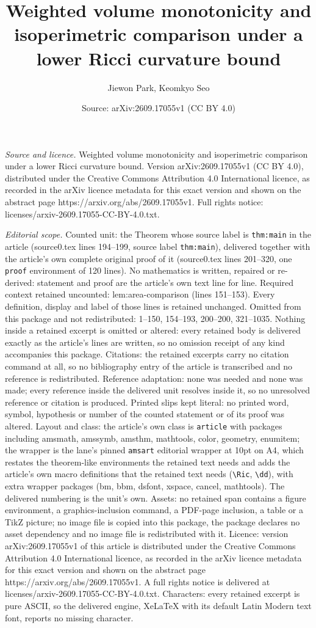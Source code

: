 \documentclass[10pt,a4paper]{amsart}
\title[Weighted volume monotonicity and isoperimetric comparison un]{Weighted volume monotonicity and isoperimetric comparison under a lower Ricci curvature bound}
\author{Jiewon Park, Keomkyo Seo}
\date{Source: arXiv:2609.17055v1 (CC BY 4.0)}
\begin{document}
\maketitle

\noindent\emph{Source and licence.} Weighted volume monotonicity and isoperimetric comparison under a lower Ricci curvature bound. Version arXiv:2609.17055v1 (CC BY 4.0), distributed under the Creative Commons Attribution 4.0 International licence, as recorded in the arXiv licence metadata for this exact version and shown on the abstract page https://arxiv.org/abs/2609.17055v1. Full rights notice: licenses/arxiv-2609.17055-CC-BY-4.0.txt.\par\smallskip

\noindent\textit{Editorial scope.} Counted unit: the Theorem whose source label is \texttt{thm:main} in the article (source0.tex lines 194--199, source label \texttt{thm:main}), delivered together with the article's own complete original proof of it (source0.tex lines 201--320, one \texttt{proof} environment of 120 lines). No mathematics is written, repaired or re-derived: statement and proof are the article's own text line for line. Required context retained uncounted: lem:area-comparison (lines 151--153). Every definition, display and label of those lines is retained unchanged. Omitted from this package and not redistributed: 1--150, 154--193, 200--200, 321--1035. Nothing inside a retained excerpt is omitted or altered: every retained body is delivered exactly as the article's lines are written, so no omission receipt of any kind accompanies this package. Citations: the retained excerpts carry no citation command at all, so no bibliography entry of the article is transcribed and no reference is redistributed. Reference adaptation: none was needed and none was made; every reference inside the delivered unit resolves inside it, so no unresolved reference or citation is produced. Printed slips kept literal: no printed word, symbol, hypothesis or number of the counted statement or of its proof was altered. Layout and class: the article's own class is \texttt{article} with packages including amsmath, amssymb, amsthm, mathtools, color, geometry, enumitem; the wrapper is the lane's pinned \texttt{amsart} editorial wrapper at 10pt on A4, which restates the theorem-like environments the retained text needs and adds the article's own macro definitions that the retained text needs (\texttt{\textbackslash Ric}, \texttt{\textbackslash dd}), with extra wrapper packages (bm, bbm, dsfont, xspace, cancel, mathtools). The delivered numbering is the unit's own. Assets: no retained span contains a figure environment, a graphics-inclusion command, a PDF-page inclusion, a table or a TikZ picture; no image file is copied into this package, the package declares no asset dependency and no image file is redistributed with it. Licence: version arXiv:2609.17055v1 of this article is distributed under the Creative Commons Attribution 4.0 International licence, as recorded in the arXiv licence metadata for this exact version and shown on the abstract page https://arxiv.org/abs/2609.17055v1. A full rights notice is delivered at licenses/arxiv-2609.17055-CC-BY-4.0.txt. Characters: every retained excerpt is pure ASCII, so the delivered engine, XeLaTeX with its default Latin Modern text font, reports no missing character.
\end{document}
